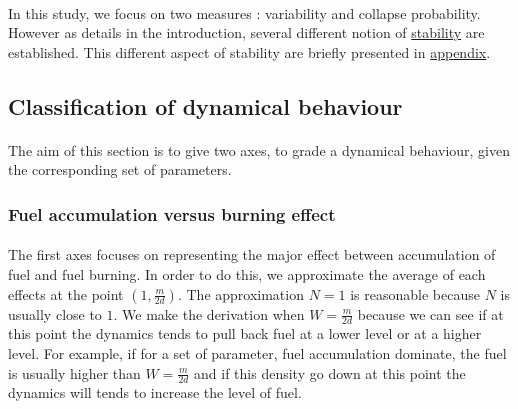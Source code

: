 \documentclass{article}
\begin{document}
\paragraph{}
In this study, we focus on two measures : variability and collapse probability. However as details in the introduction, several different notion of \hyperref[stability_litterature]{stability} are established. This different aspect of stability are briefly presented in  \hyperref[stability_others]{appendix}.




\subsection{Classification of dynamical behaviour}

\label{axes_definition}

\paragraph{}
The aim of this section is to give two axes, to grade a dynamical behaviour, given the corresponding set of parameters.


\subsubsection{Fuel accumulation versus burning effect}

\paragraph{}
The first axes focuses on representing the major effect between accumulation of fuel and fuel burning. In order to do this, we approximate the average of each effects at the point $(1, \frac{m}{2d})$. The approximation $N=1$ is reasonable because $N$ is usually close to $1$. We make the derivation when $W = \frac{m}{2d}$ because we can see if at this point the dynamics tends to pull back fuel at a lower level or at a higher level. For example, if for a set of parameter, fuel accumulation dominate, the fuel is usually higher than $W = \frac{m}{2d}$ and if this density go down at this point the dynamics will tends to increase the level of fuel.
\end{document}
